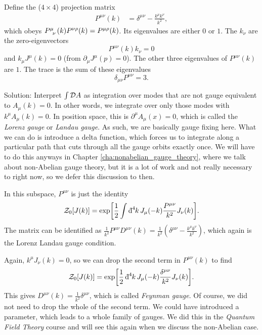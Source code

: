 Define the ($4 \times 4$) projection matrix
\begin{align}
  P^{\mu\nu}(k) &= \delta^{\mu\nu} - \frac{k^{\mu} k^{\nu}}{k^2},
\end{align}
which obeys $ P\indices{^{\mu}_{\nu}} (k) P^{\nu\rho}(k) = P^{\mu\rho}(k)$.
Its eigenvalues are either $0$ or $1$.
The $k_{\nu}$ are the zero-eigenvectors
\begin{equation}
  P^{\mu\nu}(k) k_{\nu} = 0
\end{equation}
and $k_{\mu} J^{\mu}(k) = 0$ (from $\partial_{\mu} J^{\mu}(p) = 0$).
The other three eigenvalues of $P^{\mu\nu}(k)$ are $1$.
The trace is the sum of these eigenvalues
\begin{equation}
  \delta_{\mu\nu} P^{\mu\nu} = 3.
\end{equation}

Solution: Interpret $\int \pdd{A}$ as integration over modes that are not gauge equivalent to $A_{\mu}(k) = 0$.
In other words, we integrate over only those modes with $k^{\mu} A_{\mu}(k) = 0$.
In position space, this is $\partial^{\mu} A_{\mu}(x) = 0$, which is called the \emph{Lorenz gauge} or \emph{Landau gauge}.
As such, we are basically gauge fixing here.
What we can do is introduce a delta function, which forces us to integrate along a particular path that cuts through all the gauge orbits exactly once.
We will have to do this anyways in Chapter \ref{cha:nonabelian_gauge_theory}, where we talk about non-Abelian gauge theory, but it is a lot of work and not really necessary to right now, so we defer this discussion to then.

In this subspace, $P^{\mu\nu}$ is just the identity
\begin{equation}
  \mathcal{Z}_0[J(k)] = \exp[\frac{1}{2} \int \bdd[4]{k} J_{\mu}(-k) \frac{P^{\mu\nu}}{k^2} J_{\nu}(k)].
\end{equation}
The matrix can be identified as $\frac{1}{k^2} P^{\mu\nu}D^{\mu\nu}(k) = \frac{1}{k^2} (\delta^{\mu\nu} - \frac{k^{\mu} k^{\nu}}{k^2})$, which again is the Lorenz Landau gauge condition.

Again, $k^{\mu} J_{\nu}(k) = 0$, so we can drop the second term in $P^{\mu\nu}(k)$ to find 
\begin{equation}
  \mathcal{Z}_0[J(k)] = \exp[\frac{1}{2} \bdd[4]{k} J_{\mu}(-k) \frac{\delta^{\mu\nu}}{k^2} J_{\nu}(k)].
\end{equation}
This gives $D^{\mu\nu}(k) = \frac{1}{k^2} \delta^{\mu\nu}$, which is called \emph{Feynman gauge}.
Of course, we did not need to drop the whole of the second term. We could have introduced a parameter, which leads to a whole family of gauges. We did this in the \emph{Quantum Field Theory} course and will see this again when we discuss the non-Abelian case.

